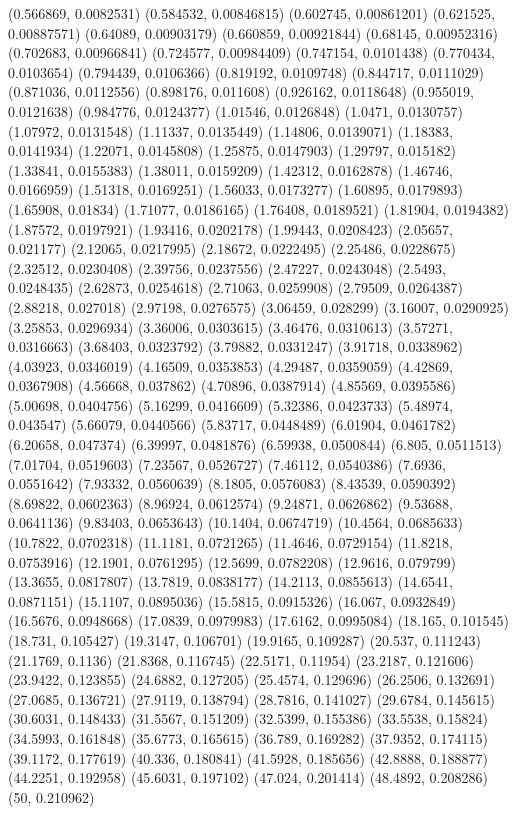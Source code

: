 {(0.566869, 0.0082531)
(0.584532, 0.00846815)
(0.602745, 0.00861201)
(0.621525, 0.00887571)
(0.64089, 0.00903179)
(0.660859, 0.00921844)
(0.68145, 0.00952316)
(0.702683, 0.00966841)
(0.724577, 0.00984409)
(0.747154, 0.0101438)
(0.770434, 0.0103654)
(0.794439, 0.0106366)
(0.819192, 0.0109748)
(0.844717, 0.0111029)
(0.871036, 0.0112556)
(0.898176, 0.011608)
(0.926162, 0.0118648)
(0.955019, 0.0121638)
(0.984776, 0.0124377)
(1.01546, 0.0126848)
(1.0471, 0.0130757)
(1.07972, 0.0131548)
(1.11337, 0.0135449)
(1.14806, 0.0139071)
(1.18383, 0.0141934)
(1.22071, 0.0145808)
(1.25875, 0.0147903)
(1.29797, 0.015182)
(1.33841, 0.0155383)
(1.38011, 0.0159209)
(1.42312, 0.0162878)
(1.46746, 0.0166959)
(1.51318, 0.0169251)
(1.56033, 0.0173277)
(1.60895, 0.0179893)
(1.65908, 0.01834)
(1.71077, 0.0186165)
(1.76408, 0.0189521)
(1.81904, 0.0194382)
(1.87572, 0.0197921)
(1.93416, 0.0202178)
(1.99443, 0.0208423)
(2.05657, 0.021177)
(2.12065, 0.0217995)
(2.18672, 0.0222495)
(2.25486, 0.0228675)
(2.32512, 0.0230408)
(2.39756, 0.0237556)
(2.47227, 0.0243048)
(2.5493, 0.0248435)
(2.62873, 0.0254618)
(2.71063, 0.0259908)
(2.79509, 0.0264387)
(2.88218, 0.027018)
(2.97198, 0.0276575)
(3.06459, 0.028299)
(3.16007, 0.0290925)
(3.25853, 0.0296934)
(3.36006, 0.0303615)
(3.46476, 0.0310613)
(3.57271, 0.0316663)
(3.68403, 0.0323792)
(3.79882, 0.0331247)
(3.91718, 0.0338962)
(4.03923, 0.0346019)
(4.16509, 0.0353853)
(4.29487, 0.0359059)
(4.42869, 0.0367908)
(4.56668, 0.037862)
(4.70896, 0.0387914)
(4.85569, 0.0395586)
(5.00698, 0.0404756)
(5.16299, 0.0416609)
(5.32386, 0.0423733)
(5.48974, 0.043547)
(5.66079, 0.0440566)
(5.83717, 0.0448489)
(6.01904, 0.0461782)
(6.20658, 0.047374)
(6.39997, 0.0481876)
(6.59938, 0.0500844)
(6.805, 0.0511513)
(7.01704, 0.0519603)
(7.23567, 0.0526727)
(7.46112, 0.0540386)
(7.6936, 0.0551642)
(7.93332, 0.0560639)
(8.1805, 0.0576083)
(8.43539, 0.0590392)
(8.69822, 0.0602363)
(8.96924, 0.0612574)
(9.24871, 0.0626862)
(9.53688, 0.0641136)
(9.83403, 0.0653643)
(10.1404, 0.0674719)
(10.4564, 0.0685633)
(10.7822, 0.0702318)
(11.1181, 0.0721265)
(11.4646, 0.0729154)
(11.8218, 0.0753916)
(12.1901, 0.0761295)
(12.5699, 0.0782208)
(12.9616, 0.079799)
(13.3655, 0.0817807)
(13.7819, 0.0838177)
(14.2113, 0.0855613)
(14.6541, 0.0871151)
(15.1107, 0.0895036)
(15.5815, 0.0915326)
(16.067, 0.0932849)
(16.5676, 0.0948668)
(17.0839, 0.0979983)
(17.6162, 0.0995084)
(18.165, 0.101545)
(18.731, 0.105427)
(19.3147, 0.106701)
(19.9165, 0.109287)
(20.537, 0.111243)
(21.1769, 0.1136)
(21.8368, 0.116745)
(22.5171, 0.11954)
(23.2187, 0.121606)
(23.9422, 0.123855)
(24.6882, 0.127205)
(25.4574, 0.129696)
(26.2506, 0.132691)
(27.0685, 0.136721)
(27.9119, 0.138794)
(28.7816, 0.141027)
(29.6784, 0.145615)
(30.6031, 0.148433)
(31.5567, 0.151209)
(32.5399, 0.155386)
(33.5538, 0.15824)
(34.5993, 0.161848)
(35.6773, 0.165615)
(36.789, 0.169282)
(37.9352, 0.174115)
(39.1172, 0.177619)
(40.336, 0.180841)
(41.5928, 0.185656)
(42.8888, 0.188877)
(44.2251, 0.192958)
(45.6031, 0.197102)
(47.024, 0.201414)
(48.4892, 0.208286)
(50, 0.210962)
}

